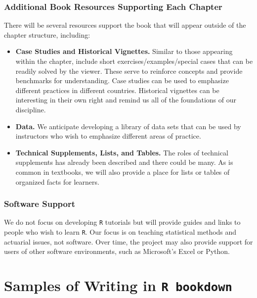 \documentclass[]{book}
\providecommand{\tightlist}{%
  \setlength{\itemsep}{0pt}\setlength{\parskip}{0pt}}
\theoremstyle{definition}
\theoremstyle{definition}
\theoremstyle{definition}
\theoremstyle{remark}
\begin{document}
\subsection{Additional Book Resources Supporting Each
Chapter}\label{additional-book-resources-supporting-each-chapter}

There will be several resources support the book that will appear
outside of the chapter structure, including:

\begin{itemize}
\tightlist
\item
  \textbf{Case Studies and Historical Vignettes.} Similar to those
  appearing within the chapter, include short exercises/examples/special
  cases that can be readily solved by the viewer. These serve to
  reinforce concepts and provide benchmarks for understanding. Case
  studies can be used to emphasize different practices in different
  countries. Historical vignettes can be interesting in their own right
  and remind us all of the foundations of our discipline.
\item
  \textbf{Data.} We anticipate developing a library of data sets that
  can be used by instructors who wish to emphasize different areas of
  practice.
\item
  \textbf{Technical Supplements, Lists, and Tables.} The roles of
  technical supplements has already been described and there could be
  many. As is common in textbooks, we will also provide a place for
  lists or tables of organized facts for learners.
\end{itemize}

\subsection{Software Support}\label{software-support}

We do not focus on developing \texttt{R} tutorials but will provide
guides and links to people who wish to learn \texttt{R}. Our focus is on
teaching statistical methods and actuarial issues, not software. Over
time, the project may also provide support for users of other software
environments, such as Microsoft's Excel or Python.

\chapter{\texorpdfstring{Samples of Writing in
\texttt{R\ bookdown}}{Samples of Writing in R bookdown}}\label{S:SampleSection}
\end{document}
